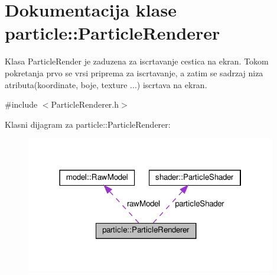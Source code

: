 \hypertarget{classparticle_1_1ParticleRenderer}{}\section{Dokumentacija klase particle\+:\+:Particle\+Renderer}
\label{classparticle_1_1ParticleRenderer}


Klasa Particle\+Render je zaduzena za iscrtavanje cestica na ekran. Tokom pokretanja prvo se vrsi priprema za iscrtavanje, a zatim se sadrzaj niza atributa(koordinate, boje, texture ...) iscrtava na ekran.  




{\ttfamily \#include $<$Particle\+Renderer.\+h$>$}



Klasni dijagram za particle\+:\+:Particle\+Renderer\+:
\nopagebreak
\begin{figure}[H]
\begin{center}
\leavevmode
\includegraphics[width=310pt]{classparticle_1_1ParticleRenderer__coll__graph}
\end{center}
\end{figure}
